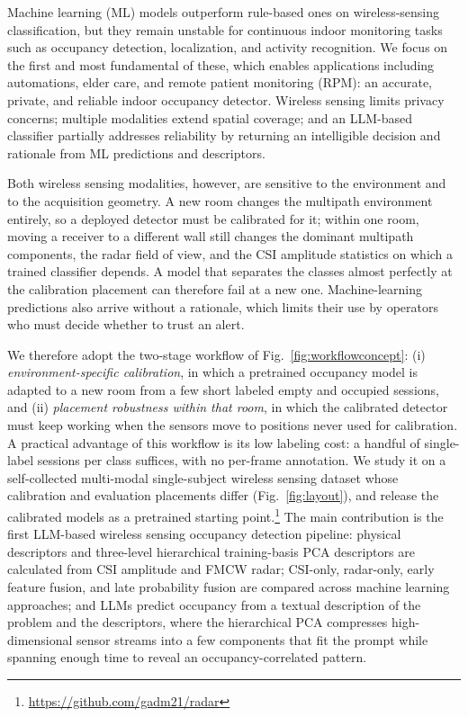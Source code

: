 \documentclass[conference,10pt,letterpaper]{IEEEtran}
\begin{document}
Machine learning (ML) models outperform rule-based ones on wireless-sensing classification, but they remain unstable for continuous indoor monitoring tasks such as occupancy detection, localization, and activity recognition. We focus on the first and most fundamental of these, which enables applications including automations, elder care, and remote patient monitoring (RPM): an accurate, private, and reliable indoor occupancy detector. Wireless sensing limits privacy concerns; multiple modalities extend spatial coverage; and an LLM-based classifier partially addresses reliability by returning an intelligible decision and rationale from ML predictions and descriptors.

Both wireless sensing modalities, however, are sensitive to the environment and to the acquisition geometry. A new room changes the multipath environment entirely, so a deployed detector must be calibrated for it; within one room, moving a receiver to a different wall still changes the dominant multipath components, the radar field of view, and the CSI amplitude statistics on which a trained classifier depends. A model that separates the classes almost perfectly at the calibration placement can therefore fail at a new one. Machine-learning predictions also arrive without a rationale, which limits their use by operators who must decide whether to trust an alert.

We therefore adopt the two-stage workflow of Fig.~\ref{fig:workflowconcept}: (i) \emph{environment-specific calibration}, in which a pretrained occupancy model is adapted to a new room from a few short labeled empty and occupied sessions, and (ii) \emph{placement robustness within that room}, in which the calibrated detector must keep working when the sensors move to positions never used for calibration. A practical advantage of this workflow is its low labeling cost: a handful of single-label sessions per class suffices, with no per-frame annotation. We study it on a self-collected multi-modal single-subject wireless sensing dataset whose calibration and evaluation placements differ (Fig.~\ref{fig:layout}), and release the calibrated models as a pretrained starting point.\footnote{\url{https://github.com/gadm21/radar}} The main contribution is the first LLM-based wireless sensing occupancy detection pipeline: physical descriptors and three-level hierarchical training-basis PCA descriptors are calculated from CSI amplitude and FMCW radar; CSI-only, radar-only, early feature fusion, and late probability fusion are compared across machine learning approaches; and LLMs predict occupancy from a textual description of the problem and the descriptors, where the hierarchical PCA compresses high-dimensional sensor streams into a few components that fit the prompt while spanning enough time to reveal an occupancy-correlated pattern.
\end{document}
